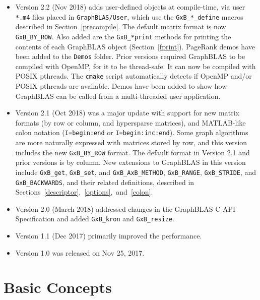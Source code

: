 \documentclass[12pt]{article}
\begin{document}
\begin{itemize}
\item
Version 2.2 (Nov 2018)
adds user-defined objects at compile-time, via user \verb'*.m4' files placed in
\verb'GraphBLAS/User', which use the \verb'GxB_*_define' macros described in
Section~\ref{precompile}.  The default matrix format is now \verb'GxB_BY_ROW'.
Also added are the \verb'GxB_*print' methods for printing the contents of each
GraphBLAS object (Section~\ref{fprint}).   PageRank demos have been added to
the \verb'Demos' folder.
Prior versions required GraphBLAS to be compiled with OpenMP, for it to be
thread-safe.  It can now be compiled with POSIX pthreads.  The \verb'cmake'
script automatically detects if OpenMP and/or POSIX pthreads are available.
Demos have been added to show how GraphBLAS can be called from a multi-threaded
user application.

\item
Version 2.1 (Oct 2018) was
a major update with support for new matrix formats
(by row or column, and hypersparse matrices), and MATLAB-like colon notation
(\verb'I=begin:end' or \verb'I=begin:inc:end').  Some graph algorithms are more
naturally expressed with matrices stored by row, and this version includes the
new \verb'GxB_BY_ROW' format.  The default format in Version 2.1 and
prior versions is by column.
New extensions to GraphBLAS in this version include \verb'GxB_get',
\verb'GxB_set', and \verb'GxB_AxB_METHOD', \verb'GxB_RANGE', \verb'GxB_STRIDE',
and \verb'GxB_BACKWARDS', and their related definitions, described in
Sections~\ref{descriptor},~\ref{options},~and~\ref{colon}.

\item
Version 2.0 (March 2018) addressed changes in the GraphBLAS C API
Specification and added \verb'GxB_kron' and \verb'GxB_resize'.

\item
Version 1.1 (Dec 2017) primarily improved the performance.

\item
Version 1.0 was released on Nov 25, 2017.
\end{itemize}


\newpage
\section{Basic Concepts} %
\label{basic}
\end{document}

